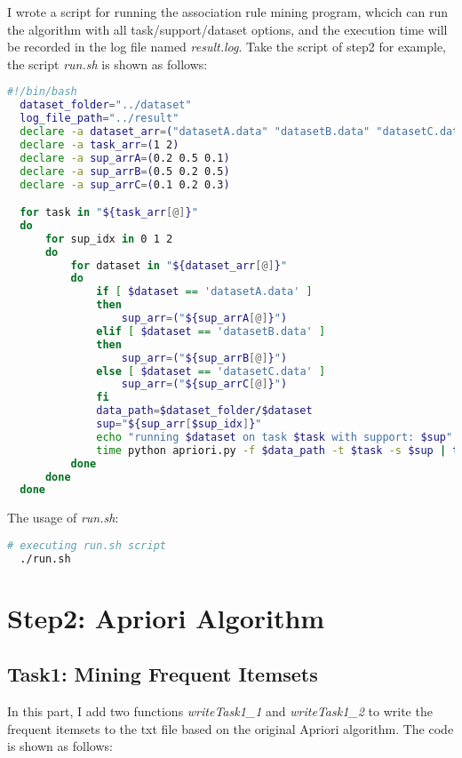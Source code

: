 \documentclass[a4paper, oneside, final, 12pt]{scrartcl} %
\begin{document}
I wrote a script for running the association rule mining program,
whcich can run the algorithm with all task/support/dataset options,
and the execution time will be recorded in the log file named \emph{result.log}.
Take the script of step2 for example, the script 
\emph{run.sh} is shown as follows:

\begin{lstlisting}[language=bash]
  #!/bin/bash
  dataset_folder="../dataset"
  log_file_path="../result"
  declare -a dataset_arr=("datasetA.data" "datasetB.data" "datasetC.data")
  declare -a task_arr=(1 2)
  declare -a sup_arrA=(0.2 0.5 0.1)
  declare -a sup_arrB=(0.5 0.2 0.5)
  declare -a sup_arrC=(0.1 0.2 0.3)

  for task in "${task_arr[@]}"
  do
      for sup_idx in 0 1 2
      do
          for dataset in "${dataset_arr[@]}"
          do
              if [ $dataset == 'datasetA.data' ]
              then
                  sup_arr=("${sup_arrA[@]}")
              elif [ $dataset == 'datasetB.data' ]
              then
                  sup_arr=("${sup_arrB[@]}")
              else [ $dataset == 'datasetC.data' ]
                  sup_arr=("${sup_arrC[@]}")
              fi
              data_path=$dataset_folder/$dataset
              sup="${sup_arr[$sup_idx]}"
              echo "running $dataset on task $task with support: $sup"
              time python apriori.py -f $data_path -t $task -s $sup | tee -a $log_file_path/result.log
          done
      done
  done
\end{lstlisting}

The usage of \emph{run.sh}:

\begin{lstlisting}[language=bash]
  # executing run.sh script
  ./run.sh
\end{lstlisting}

\endgroup

\section{Step2: Apriori Algorithm}

\subsection{Task1: Mining Frequent Itemsets}

\begingroup
\raggedright
In this part, I add two functions \emph{writeTask1\_1} and \emph{writeTask1\_2} to
write the frequent itemsets to the txt file based on the original Apriori algorithm. 
The code is shown as follows:
\end{document}
